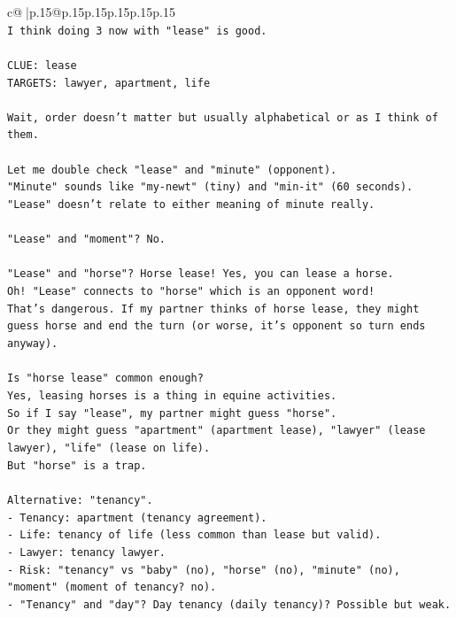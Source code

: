 \documentclass{article}
\begin{document}
{\begin{supertabular}{c@{$\;$}|p{.15\linewidth}@{}p{.15\linewidth}p{.15\linewidth}p{.15\linewidth}p{.15\linewidth}p{.15\linewidth}}
{{{\\ 
\texttt{I think doing 3 now with "lease" is good.} \\
\\ 
\texttt{CLUE: lease} \\
\texttt{TARGETS: lawyer, apartment, life} \\
\\ 
\texttt{Wait, order doesn't matter but usually alphabetical or as I think of them.} \\
\\ 
\texttt{Let me double check "lease" and "minute" (opponent).} \\
\texttt{"Minute" sounds like "my{-}newt" (tiny) and "min{-}it" (60 seconds).} \\
\texttt{"Lease" doesn't relate to either meaning of minute really.} \\
\\ 
\texttt{"Lease" and "moment"? No.} \\
\\ 
\texttt{"Lease" and "horse"? Horse lease! Yes, you can lease a horse.} \\
\texttt{Oh! "Lease" connects to "horse" which is an opponent word!} \\
\texttt{That's dangerous. If my partner thinks of horse lease, they might guess horse and end the turn (or worse, it's opponent so turn ends anyway).} \\
\\ 
\texttt{Is "horse lease" common enough?} \\
\texttt{Yes, leasing horses is a thing in equine activities.} \\
\texttt{So if I say "lease", my partner might guess "horse".} \\
\texttt{Or they might guess "apartment" (apartment lease), "lawyer" (lease lawyer), "life" (lease on life).} \\
\texttt{But "horse" is a trap.} \\
\\ 
\texttt{Alternative: "tenancy".} \\
\texttt{{-} Tenancy: apartment (tenancy agreement).} \\
\texttt{{-} Life: tenancy of life (less common than lease but valid).} \\
\texttt{{-} Lawyer: tenancy lawyer.} \\
\texttt{{-} Risk: "tenancy" vs "baby" (no), "horse" (no), "minute" (no), "moment" (moment of tenancy? no).} \\
\texttt{{-} "Tenancy" and "day"? Day tenancy (daily tenancy)? Possible but weak.} \\
}}}
\end{supertabular}}
\end{document}
